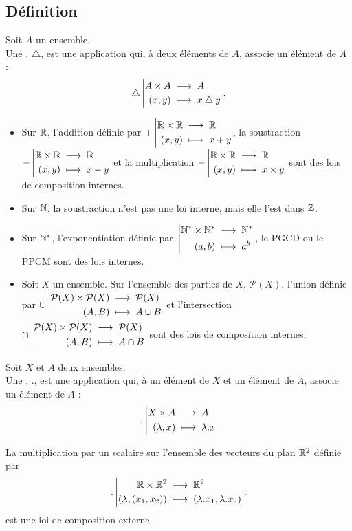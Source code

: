 \documentclass{book}
\begin{document}
\subsection{Définition}
\begin{Definition}
Soit $A$ un ensemble.\\
Une , $\bigtriangleup$, est une application qui, à deux éléments de $A$, associe un élément de $A$ :
$$ {\bigtriangleup}\left|\begin{aligned}{A\times A}&\;\longrightarrow\;{A}\\{(x,y)}&\;\longmapsto\;{x \bigtriangleup y}\end{aligned}\right..$$
\end{Definition}
\begin{Exemple}
\begin{itemize}
\item Sur $\mathbb{R}$, l'addition définie par ${+}\left|\begin{aligned}{\mathbb{R}\times \mathbb{R}}&\;\longrightarrow\;{\mathbb{R}}\\{(x,y)}&\;\longmapsto\;{x + y}\end{aligned}\right.$, la soustraction ${-}\left|\begin{aligned}{\mathbb{R}\times \mathbb{R}}&\;\longrightarrow\;{\mathbb{R}}\\{(x,y)}&\;\longmapsto\;{x - y}\end{aligned}\right.$ et la multiplication ${-}\left|\begin{aligned}{\mathbb{R}\times \mathbb{R}}&\;\longrightarrow\;{\mathbb{R}}\\{(x,y)}&\;\longmapsto\;{x \times y}\end{aligned}\right.$ sont des lois de composition internes.
\item Sur $\mathbb{N}$, la soustraction n'est pas une loi interne, mais elle l'est dans $\mathbb{Z}$.
\item Sur $\mathbb{N}^*$,  l'exponentiation définie par ${}\left|\begin{aligned}{\mathbb{N}^*\times\mathbb{N}^*}&\;\longrightarrow\;{\mathbb{N}^*}\\{(a,b)}&\;\longmapsto\;{a^b}\end{aligned}\right.$, le PGCD ou le PPCM sont des lois internes.
\item Soit $X$ un ensemble. Sur l'ensemble des parties de $X$, $\mathcal{P}(X)$, l'union définie par ${\cup}\left|\begin{aligned}{\mathcal{P}(X)\times \mathcal{P}(X)}&\;\longrightarrow\;{\mathcal{P}(X)}\\{(A,B)}&\;\longmapsto\;{A \cup B}\end{aligned}\right.$ et l'intersection ${\cap}\left|\begin{aligned}{\mathcal{P}(X)\times \mathcal{P}(X)}&\;\longrightarrow\;{\mathcal{P}(X)}\\{(A,B)}&\;\longmapsto\;{A \cap B}\end{aligned}\right.$ sont des lois de composition internes.
\end{itemize}
\end{Exemple}

\begin{Definition} 
Soit $X$ et $A$ deux ensembles.\\
Une , $.$, est une application qui, à un élément de $X$ et un élément de $A$, associe un élément de $A$ :
$$ {.}\left|\begin{aligned}{X\times A}&\;\longrightarrow\;{A}\\{(\lambda,x)}&\;\longmapsto\;{\lambda. x}\end{aligned}\right. $$
\end{Definition}
\begin{Exemple}[\((\R^2,.)\)]
La multiplication par un scalaire sur l'ensemble des vecteurs du plan  $\mathbb{R}^2$ définie par 
$$ {.}\left|\begin{aligned}{\mathbb{R}\times\mathbb{R}^2}&\;\longrightarrow\;{\mathbb{R}^2}\\{(\lambda,(x_1,x_2))}&\;\longmapsto\;{(\lambda.x_1, \lambda.x_2)}\end{aligned}\right..$$ est une loi de composition externe.
\end{Exemple}
\end{document}
